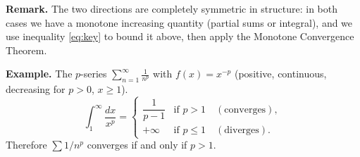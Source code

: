 \documentclass[12pt]{article}
\begin{document}
\bigskip
\noindent\textbf{Remark.} The two directions are completely symmetric in structure:
in both cases we have a monotone increasing quantity (partial sums or integral),
and we use inequality \eqref{eq:key} to bound it above, then apply the
Monotone Convergence Theorem.

\bigskip
\noindent\textbf{Example.} The $p$-series $\displaystyle\sum_{n=1}^{\infty} \frac{1}{n^p}$
with $f(x) = x^{-p}$ (positive, continuous, decreasing for $p>0$, $x\geq 1$).
\[
    \int_1^{\infty} \frac{dx}{x^p} =
    \begin{cases}
        \dfrac{1}{p-1} & \text{if } p > 1 \quad (\text{converges}), \\[6pt]
        +\infty         & \text{if } p \leq 1 \quad (\text{diverges}).
    \end{cases}
\]
Therefore $\sum 1/n^p$ converges if and only if $p > 1$.
\end{document}
